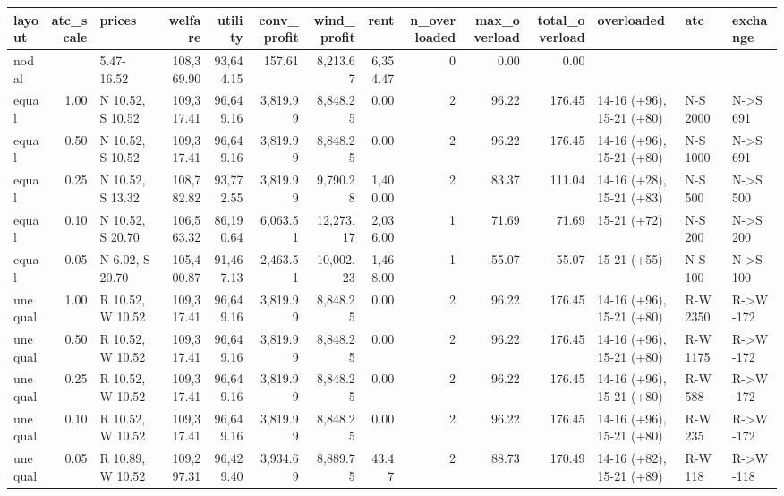 \begin{tabular}{lrlrrrrrrrrlll}
\toprule
layout & atc\_scale & prices & welfare & utility & conv\_profit & wind\_profit & rent & n\_overloaded & max\_overload & total\_overload & overloaded & atc & exchange \\
\midrule
nodal &  & 5.47-16.52 & 108,369.90 & 93,644.15 & 157.61 & 8,213.67 & 6,354.47 & 0 & 0.00 & 0.00 &  &  &  \\
equal & 1.00 & N 10.52, S 10.52 & 109,317.41 & 96,649.16 & 3,819.99 & 8,848.25 & 0.00 & 2 & 96.22 & 176.45 & 14-16 (+96), 15-21 (+80) & N-S 2000 & N->S 691 \\
equal & 0.50 & N 10.52, S 10.52 & 109,317.41 & 96,649.16 & 3,819.99 & 8,848.25 & 0.00 & 2 & 96.22 & 176.45 & 14-16 (+96), 15-21 (+80) & N-S 1000 & N->S 691 \\
equal & 0.25 & N 10.52, S 13.32 & 108,782.82 & 93,772.55 & 3,819.99 & 9,790.28 & 1,400.00 & 2 & 83.37 & 111.04 & 14-16 (+28), 15-21 (+83) & N-S 500 & N->S 500 \\
equal & 0.10 & N 10.52, S 20.70 & 106,563.32 & 86,190.64 & 6,063.51 & 12,273.17 & 2,036.00 & 1 & 71.69 & 71.69 & 15-21 (+72) & N-S 200 & N->S 200 \\
equal & 0.05 & N 6.02, S 20.70 & 105,400.87 & 91,467.13 & 2,463.51 & 10,002.23 & 1,468.00 & 1 & 55.07 & 55.07 & 15-21 (+55) & N-S 100 & N->S 100 \\
unequal & 1.00 & R 10.52, W 10.52 & 109,317.41 & 96,649.16 & 3,819.99 & 8,848.25 & 0.00 & 2 & 96.22 & 176.45 & 14-16 (+96), 15-21 (+80) & R-W 2350 & R->W -172 \\
unequal & 0.50 & R 10.52, W 10.52 & 109,317.41 & 96,649.16 & 3,819.99 & 8,848.25 & 0.00 & 2 & 96.22 & 176.45 & 14-16 (+96), 15-21 (+80) & R-W 1175 & R->W -172 \\
unequal & 0.25 & R 10.52, W 10.52 & 109,317.41 & 96,649.16 & 3,819.99 & 8,848.25 & 0.00 & 2 & 96.22 & 176.45 & 14-16 (+96), 15-21 (+80) & R-W 588 & R->W -172 \\
unequal & 0.10 & R 10.52, W 10.52 & 109,317.41 & 96,649.16 & 3,819.99 & 8,848.25 & 0.00 & 2 & 96.22 & 176.45 & 14-16 (+96), 15-21 (+80) & R-W 235 & R->W -172 \\
unequal & 0.05 & R 10.89, W 10.52 & 109,297.31 & 96,429.40 & 3,934.69 & 8,889.75 & 43.47 & 2 & 88.73 & 170.49 & 14-16 (+82), 15-21 (+89) & R-W 118 & R->W -118 \\
\bottomrule
\end{tabular}
